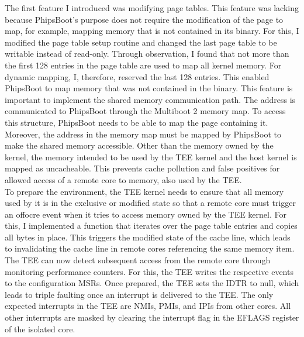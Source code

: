 The first feature I introduced was modifying page tables. This feature was
lacking because PhipsBoot's purpose does not require the modification of the
page to map, for example, mapping memory that is not contained in its binary.
For this, I modified the page table setup routine and changed the last page
table to be writable instead of read-only. Through observation, I found that not
more than the first 128 entries in the page table are used to map all kernel
memory. For dynamic mapping, I, therefore, reserved the last 128 entries. This
enabled PhipsBoot to map memory that was not contained in the binary. This
feature is important to implement the shared memory communication path. The
address is communicated to PhipsBoot through the Multiboot 2 memory map. To
access this structure, PhipsBoot needs to be able to map the page containing it.
Moreover, the address in the memory map must be mapped by PhipsBoot to make the
shared memory accessible. Other than the memory owned by the kernel, the memory
intended to be used by the TEE kernel and the host kernel is mapped as
uncacheable. This prevents cache pollution and false positives for allowed
access of a remote core to memory, also used by the TEE.\\

To prepare the environment, the TEE kernel needs to ensure that all memory used
by it is in the exclusive or modified state so that a remote core must trigger
an offocre event when it
tries to access memory owned by the TEE kernel. For this, I implemented a
function that iterates over the page table entries and copies all bytes in
place. This triggers the modified state of the cache line, which leads to
invalidating the cache line in remote cores referencing the same memory item.
The TEE can now detect subsequent access from the remote core through monitoring
performance counters. For this, the TEE writes the respective events to the
configuration MSRs. Once prepared, the TEE sets the IDTR to null, which leads to
triple faulting once an interrupt is delivered to the TEE. The only expected
interrupts in the TEE are NMIs, PMIs, and IPIs from other cores. All other
interrupts are masked by clearing the interrupt flag in the EFLAGS register of
the isolated core. \\

